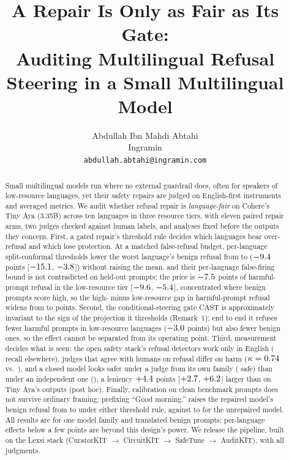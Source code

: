 \documentclass{article}
\title{A Repair Is Only as Fair as Its Gate:\\Auditing Multilingual Refusal Steering in a Small Multilingual Model}
\author{Abdullah Ibn Mahdi Abtahi\\Ingramin\\\texttt{abdullah.abtahi@ingramin.com}}
\newcommand{\ci}[2]{{\small[$#1$, $#2$]}}
\begin{document}
\maketitle

\begin{abstract}
Small multilingual models run where no external guardrail does, often for speakers of low-resource languages, yet their safety repairs are judged on English-first instruments and averaged metrics.
We audit whether refusal repair is \emph{language-fair} on Cohere's Tiny Aya (3.35B) across ten languages in three resource tiers, with eleven paired repair arms, two judges checked against human labels, and analyses fixed before the outputs they concern.
First, a gated repair's threshold rule decides which languages bear over-refusal and which lose protection. At a matched false-refusal budget, per-language split-conformal thresholds lower the worst language's benign refusal from \CtlFivePoolWorstBrr{} to \CtlFiveEorsWorstBrr{} ($-9.4$ points \ci{\CtlFiveMaxBrrLo}{\CtlFiveMaxBrrHi}) without raising the mean, and their per-language false-firing bound is not contradicted on held-out prompts; the price is $-7.5$ points of harmful-prompt refusal in the low-resource tier \ci{\CtlFiveLrlHrrLo}{\CtlFiveLrlHrrHi}, concentrated where benign prompts score high, so the high- minus low-resource gap in harmful-prompt refusal widens from \CtlFivePoolTierGap{} to \CtlFiveEorsTierGap{} points.
Second, the conditional-steering gate CAST is approximately invariant to the sign of the projection it thresholds (Remark~1); end to end it refuses fewer harmful prompts in low-resource languages ($-3.0$ points) but also fewer benign ones, so the effect cannot be separated from its operating point.
Third, measurement decides what is seen: the open safety stack's refusal detectors work only in English (\HOneRecallOtherMax{} recall elsewhere), judges that agree with humans on refusal differ on harm ($\kappa=0.74$ vs.\ \HarmKappaMean), and a closed model looks safer under a judge from its own family (\GemGSrr{} safe) than under an independent one (\GemQSrr), a leniency $+4.4$ points \ci{\CtlJudgeDidLo}{\CtlJudgeDidHi} larger than on Tiny Aya's outputs (post hoc).
Finally, calibration on clean benchmark prompts does not survive ordinary framing: prefixing ``Good morning.'' raises the repaired model's benign refusal from \CtlGreetBrrEors{} to \CtlGreetBrrEorsGreet{} under either threshold rule, against \GreetBrrEZero{} to \GreetBrrEZeroGreet{} for the unrepaired model.
All results are for one model family and translated benign prompts; per-language effects below a few points are beyond this design's power.
We release the pipeline, built on the Lexsi stack (CuratorKIT $\rightarrow$ CircuitKIT $\rightarrow$ SafeTune $\rightarrow$ AuditKIT), with all judgments.
\end{abstract}
\end{document}
